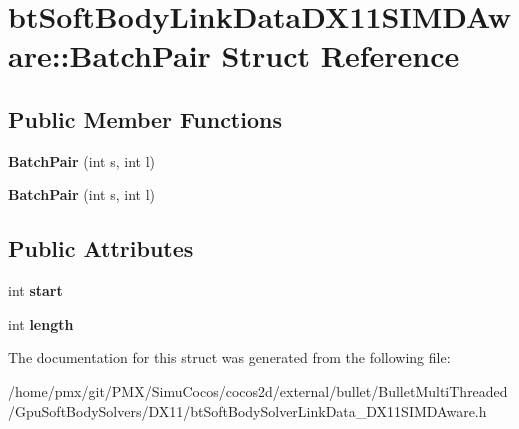 \hypertarget{structbtSoftBodyLinkDataDX11SIMDAware_1_1BatchPair}{}\section{bt\+Soft\+Body\+Link\+Data\+D\+X11\+S\+I\+M\+D\+Aware\+:\+:Batch\+Pair Struct Reference}
\label{structbtSoftBodyLinkDataDX11SIMDAware_1_1BatchPair}
\subsection*{Public Member Functions}
\begin{DoxyCompactItemize}
\item 
\mbox{\label{structbtSoftBodyLinkDataDX11SIMDAware_1_1BatchPair_aa804043d075029a569fcbb631fe5e1e4}} 
{\bfseries Batch\+Pair} (int s, int l)
\item 
\mbox{\label{structbtSoftBodyLinkDataDX11SIMDAware_1_1BatchPair_aa804043d075029a569fcbb631fe5e1e4}} 
{\bfseries Batch\+Pair} (int s, int l)
\end{DoxyCompactItemize}
\subsection*{Public Attributes}
\begin{DoxyCompactItemize}
\item 
\mbox{\label{structbtSoftBodyLinkDataDX11SIMDAware_1_1BatchPair_af2142ea39e1edddc47ff4ccabc6e83a7}} 
int {\bfseries start}
\item 
\mbox{\label{structbtSoftBodyLinkDataDX11SIMDAware_1_1BatchPair_a20d85ec76a52d3d8c8f1caf18c6beb4d}} 
int {\bfseries length}
\end{DoxyCompactItemize}


The documentation for this struct was generated from the following file\+:\begin{DoxyCompactItemize}
\item 
/home/pmx/git/\+P\+M\+X/\+Simu\+Cocos/cocos2d/external/bullet/\+Bullet\+Multi\+Threaded/\+Gpu\+Soft\+Body\+Solvers/\+D\+X11/bt\+Soft\+Body\+Solver\+Link\+Data\+\_\+\+D\+X11\+S\+I\+M\+D\+Aware.\+h\end{DoxyCompactItemize}
